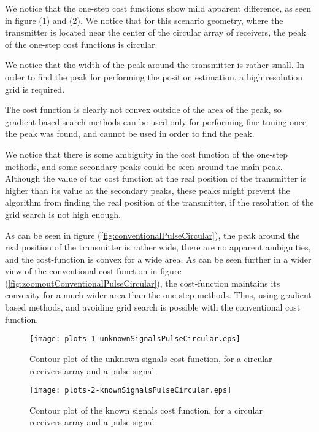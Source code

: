 We notice that the one-step cost functions show mild apparent difference, as seen in figure (\ref{fig:unknownSignalsPulseCircular}) and (\ref{fig:knownSignalsPulseCircular}). 
We notice that for this scenario geometry, where the transmitter is located near the center of the circular array of receivers, the peak of the one-step cost functions is circular. 

We notice that the width of the peak around the transmitter is rather small. In order to find the peak for performing the position estimation, a high resolution grid is required. 

The cost function is clearly not convex outside of the area of the peak, so gradient based search methods can be used only for performing fine tuning once the peak was found, and cannot be used in order to find the peak.

We notice that there is some ambiguity in the cost function of the one-step methods, and some secondary peaks could be seen around the main peak. Although the value of the cost function at the real position of the transmitter is higher than its value at the secondary peaks, these peaks might prevent the algorithm from finding the real position of the transmitter, if the resolution of the grid search is not high enough.

As can be seen in figure (\ref{fig:conventionalPulseCircular}), the peak around the real position of the transmitter is rather wide, there are no apparent ambiguities, and the cost-function is convex for a wide area. 
As can be seen further in a wider view of the conventional cost function in figure (\ref{fig:zoomoutConventionalPulseCircular}), the cost-function maintains its convexity for a much wider area than the one-step methods.
Thus, using gradient based methods, and avoiding grid search is possible with the conventional cost function.

\begin{figure}
\begin{center}
\texttt{[image: plots-1-unknownSignalsPulseCircular.eps]} 
\end{center}
\caption{Contour plot of the unknown signals cost function, for a circular receivers array and a pulse signal}
\label{fig:unknownSignalsPulseCircular}
\end{figure}

\begin{figure}
\begin{center}
\texttt{[image: plots-2-knownSignalsPulseCircular.eps]} 
\end{center}
\caption{Contour plot of the known signals cost function, for a circular receivers array and a pulse signal}
\label{fig:knownSignalsPulseCircular}
\end{figure}

